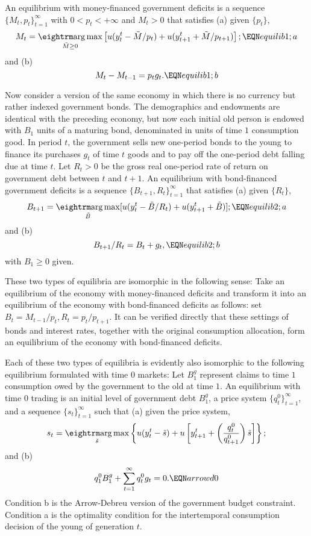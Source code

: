 \medskip
{}  An equilibrium with money-financed
government deficits is a sequence $\{M_t, p_t\}_{t=1}^\infty$
with $0 < p_t < +\infty$ and $M_t >0$ that satisfies
(a) given $\{p_t\}$,
$$ M_t = \argmax_{\tilde M \geq 0} \left[ u(y_t^t - \tilde M/p_t)
       + u(y^t_{t+1} + \tilde M/p_{t+1})\right]; \EQN equilib1;a $$
and (b) $$ M_t - M_{t-1} = p_t g_t. \EQN equilib1;b$$



\medskip
Now consider a version  of the same economy in which there is no
currency but rather indexed government bonds.  The demographics
and endowments are identical with the preceding economy, but
now each initial old   person is endowed with
$B_1$ units of a maturing bond, denominated in units of
time $1$ consumption good.  In period $t$, the government sells
new one-period  bonds   to the young to finance its purchases
$g_t$  of time $t$ goods and to pay off the one-period debt
falling due at time $t$.  Let $R_t >0$ be the gross real one-period
rate of return on government debt between $t$ and $t+1$.
\medskip
{}  An equilibrium with bond-financed government
deficits is a sequence $\{B_{t+1}, R_t\}_{t=1}^\infty$ that
satisfies (a) given $\{R_t\}$,
$$ B_{t+1} = \argmax_{\tilde B} [ u(y_t^t -\tilde B/R_t)
    + u(y^t_{t+1} + \tilde B)]; \EQN equilib2;a $$
and (b)
$$ B_{t+1}/R_t = B_t + g_t,  \EQN equilib2;b $$
with $B_1 \geq 0$ given.

    These two types of equilibria are isomorphic in the following
sense:  Take an equilibrium of the economy with money-financed
deficits and transform it into an equilibrium of the
economy with bond-financed deficits as follows:  set
$ B_t = M_{t-1} / p_t, R_t = p_t / p_{t+1}$. It can be verified
directly that these settings of bonds and interest rates, together
with the original consumption allocation,
form an equilibrium of the economy with bond-financed deficits.

  Each of these two types of equilibria is evidently also
isomorphic to the following equilibrium
formulated with time $0$ markets:
\medskip
{} Let $B^g_1$ represent claims to time $1$ consumption
owed by the government to the old at time $1$.
An equilibrium with  time $0$ trading
is an initial level of government
debt $B^g_1$, a price system $\{q_t^0\}_{t=1}^\infty$, and
a sequence $\{s_t\}_{t=1}^\infty$ such that (a)
given the price system,
$$ s_t = \argmax_{\tilde s} \left\{ u(y_t^t - \tilde s)
     + u \left[y^t_{t+1}
 + \left({q_t^0 \over q^0_{t+1}}\right) \tilde s \right] \right\};
                                                    $$
and (b)
$$ q_1^0 B_1^g + \sum_{t=1}^\infty q_t^0 g_t = 0 . \EQN arrowd0 $$
\medskip
Condition b is the  Arrow-Debreu version of the
government budget constraint.  Condition a is the optimality
condition for the intertemporal consumption decision of the young
of generation $t$.

